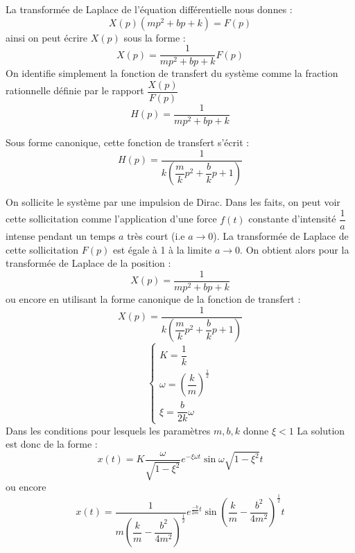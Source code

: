 
\question{}
La transformée de Laplace de l'équation différentielle nous donnes : 
\[
    X(p)\left(mp^2+bp+k\right)=F(p)
\]
ainsi on peut écrire $X(p)$ sous la forme :
\[
    X(p)=\dfrac{1}{mp^2+bp+k}F(p)
\]
\question{}
On identifie simplement la fonction de transfert du système comme la fraction 
rationnelle définie par le rapport $\dfrac{X(p)}{F(p)}$
\[
    H(p)=\dfrac{1}{mp^2+bp+k}
\]

Sous forme canonique, cette fonction de transfert s'écrit :
\[
    H(p)=\dfrac{1}{k\left(\dfrac{m}{k}p^2+\dfrac{b}{k}p+1\right)}
\]


On sollicite le système par une impulsion de Dirac. Dans les faits, on peut 
voir cette sollicitation comme l'application d'une force $f(t)$ constante 
d'intensité $\dfrac{1}{a}$ intense pendant un temps $a$ très court 
(i.e $a\to0$).    
\question{}
La transformée de Laplace de cette sollicitation $F(p)$ est égale à 1 à 
la limite $a\to0$. On obtient alors pour la transformée de Laplace de la 
position :
\[
    X(p)=\dfrac{1}{mp^2+bp+k}
\]
ou encore en utilisant la forme canonique de la fonction de transfert :
\[
    X(p)=\dfrac{1}{k\left(\dfrac{m}{k}p^2+\dfrac{b}{k}p+1\right)}
\]
\question{}
\[
    \begin{cases}
        K=\dfrac{1}{k}\\[1.5em]
        \omega=\left(\dfrac{k}{m}\right)^{\frac{1}{2}}\\[1.5em]
        \xi=\dfrac{b}{2k}\omega
    \end{cases}
\]
\question{}
Dans les conditions pour lesquels les paramètres $m, b ,k$ donne $\xi<1$ 
La solution est donc de la forme :
\[
    x(t)=K\dfrac{\omega}{\sqrt{1-\xi^2}}
         e^{-\xi\omega t}\sin{\omega\sqrt{1-\xi^2} t} 
\]
ou encore 
\[
    x(t)=\dfrac{1}{m\left(\dfrac{k}{m}-\dfrac{b^2}{4m^2}\right)^{\frac{1}{2}}}
         e^{\frac{-b}{2m}t}\sin{\left(\dfrac{k}{m}-\dfrac{b^2}{4m^2}\right)^
         {\frac{1}{2}}t}
\]

